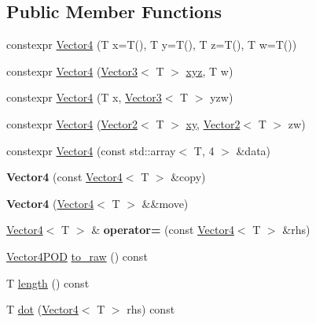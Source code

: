 \subsection*{Public Member Functions}
\begin{DoxyCompactItemize}
\item 
constexpr \mbox{\hyperlink{class_vector4_a31fd25d0c9ad1a2cecd77ea11449b1df}{Vector4}} (T x=T(), T y=T(), T z=T(), T w=T())
\item 
constexpr \mbox{\hyperlink{class_vector4_aaf5bba42bd8e0326baf0ae5f4231178f}{Vector4}} (\mbox{\hyperlink{class_vector3}{Vector3}}$<$ T $>$ \mbox{\hyperlink{class_vector4_a64bc2c65683c50be01c8646487d4d5b2}{xyz}}, T w)
\item 
constexpr \mbox{\hyperlink{class_vector4_a91352d9e5a2063fdc15234ceb3492dc4}{Vector4}} (T x, \mbox{\hyperlink{class_vector3}{Vector3}}$<$ T $>$ yzw)
\item 
constexpr \mbox{\hyperlink{class_vector4_a350701fc93b120a693efc7ab313f0a8a}{Vector4}} (\mbox{\hyperlink{class_vector2}{Vector2}}$<$ T $>$ \mbox{\hyperlink{class_vector4_aca433dfa3d0e963899d6a3916fda347a}{xy}}, \mbox{\hyperlink{class_vector2}{Vector2}}$<$ T $>$ zw)
\item 
constexpr \mbox{\hyperlink{class_vector4_a2503315a6418e38bf423c9fb7b33eec3}{Vector4}} (const std\+::array$<$ T, 4 $>$ \&data)
\item 
\mbox{\label{class_vector4_a1095f023acf24ec6f86301378f2a07b9}} 
{\bfseries Vector4} (const \mbox{\hyperlink{class_vector4}{Vector4}}$<$ T $>$ \&copy)
\item 
\mbox{\label{class_vector4_a8e5281eeaaa1b01944d37ca499582cb8}} 
{\bfseries Vector4} (\mbox{\hyperlink{class_vector4}{Vector4}}$<$ T $>$ \&\&move)
\item 
\mbox{\label{class_vector4_ac509e5d08d3222ebb06922ca5467ae02}} 
\mbox{\hyperlink{class_vector4}{Vector4}}$<$ T $>$ \& {\bfseries operator=} (const \mbox{\hyperlink{class_vector4}{Vector4}}$<$ T $>$ \&rhs)
\item 
\mbox{\hyperlink{struct_vector4_p_o_d}{Vector4\+P\+OD}} \mbox{\hyperlink{class_vector4_a4fea99cf190d3d29f9aaa36acd07a49a}{to\+\_\+raw}} () const
\item 
T \mbox{\hyperlink{class_vector4_a1c8ab62fe32713c21353d71a1b23b0f2}{length}} () const
\item 
T \mbox{\hyperlink{class_vector4_ae9d1720458cdff4084f2f20dadbc0dd7}{dot}} (\mbox{\hyperlink{class_vector4}{Vector4}}$<$ T $>$ rhs) const

\end{DoxyCompactItemize}
